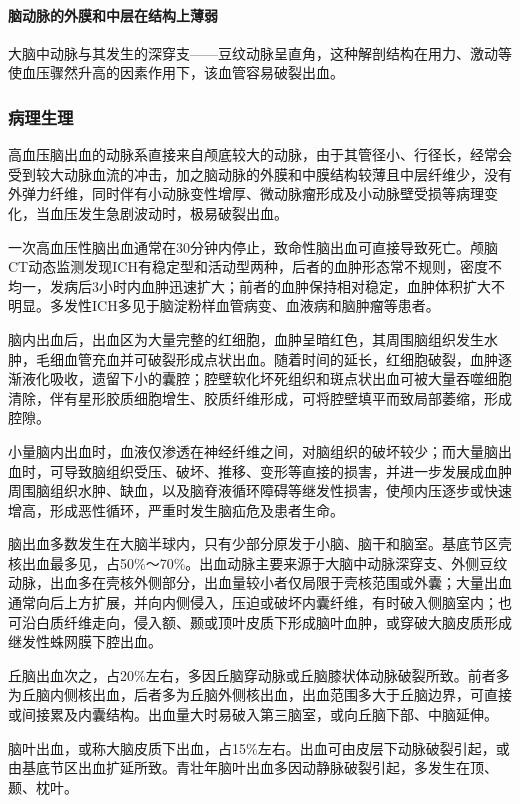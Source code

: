 \paragraph{脑动脉的外膜和中层在结构上薄弱}

大脑中动脉与其发生的深穿支------豆纹动脉呈直角，这种解剖结构在用力、激动等使血压骤然升高的因素作用下，该血管容易破裂出血。

\subsubsection{病理生理}

高血压脑出血的动脉系直接来自颅底较大的动脉，由于其管径小、行径长，经常会受到较大动脉血流的冲击，加之脑动脉的外膜和中膜结构较薄且中层纤维少，没有外弹力纤维，同时伴有小动脉变性增厚、微动脉瘤形成及小动脉壁受损等病理变化，当血压发生急剧波动时，极易破裂出血。

一次高血压性脑出血通常在30分钟内停止，致命性脑出血可直接导致死亡。颅脑CT动态监测发现ICH有稳定型和活动型两种，后者的血肿形态常不规则，密度不均一，发病后3小时内血肿迅速扩大；前者的血肿保持相对稳定，血肿体积扩大不明显。多发性ICH多见于脑淀粉样血管病变、血液病和脑肿瘤等患者。

脑内出血后，出血区为大量完整的红细胞，血肿呈暗红色，其周围脑组织发生水肿，毛细血管充血并可破裂形成点状出血。随着时间的延长，红细胞破裂，血肿逐渐液化吸收，遗留下小的囊腔；腔壁软化坏死组织和斑点状出血可被大量吞噬细胞清除，伴有星形胶质细胞增生、胶质纤维形成，可将腔壁填平而致局部萎缩，形成腔隙。

小量脑内出血时，血液仅渗透在神经纤维之间，对脑组织的破坏较少；而大量脑出血时，可导致脑组织受压、破坏、推移、变形等直接的损害，并进一步发展成血肿周围脑组织水肿、缺血，以及脑脊液循环障碍等继发性损害，使颅内压逐步或快速增高，形成恶性循环，严重时发生脑疝危及患者生命。

脑出血多数发生在大脑半球内，只有少部分原发于小脑、脑干和脑室。基底节区壳核出血最多见，占50\%～70\%。出血动脉主要来源于大脑中动脉深穿支、外侧豆纹动脉，出血多在壳核外侧部分，出血量较小者仅局限于壳核范围或外囊；大量出血通常向后上方扩展，并向内侧侵入，压迫或破坏内囊纤维，有时破入侧脑室内；也可沿白质纤维走向，侵入额、颞或顶叶皮质下形成脑叶血肿，或穿破大脑皮质形成继发性蛛网膜下腔出血。

丘脑出血次之，占20\%左右，多因丘脑穿动脉或丘脑膝状体动脉破裂所致。前者多为丘脑内侧核出血，后者多为丘脑外侧核出血，出血范围多大于丘脑边界，可直接或间接累及内囊结构。出血量大时易破入第三脑室，或向丘脑下部、中脑延伸。

脑叶出血，或称大脑皮质下出血，占15\%左右。出血可由皮层下动脉破裂引起，或由基底节区出血扩延所致。青壮年脑叶出血多因动静脉破裂引起，多发生在顶、颞、枕叶。

